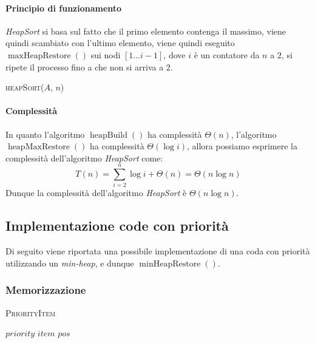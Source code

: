             \paragraph{Principio di funzionamento} \textit{HeapSort} si basa sul fatto che il primo elemento contenga il massimo, viene quindi scambiato con l'ultimo elemento, viene quindi eseguito $\operatorname{maxHeapRestore}()$ sui nodi $[1\dots i-1]$, dove $i$ è un contatore da $n$ a $2$, si ripete il processo fino a che non si arriva a $2$.
            \begin{algorithm}
                \caption{\textsc{heapSort}(\Item[] $A$, \Int $n$)}
                \begin{algorithmic}
                    \State {}
                        \State {}
                        \State {}
                    \EndFor
                \end{algorithmic}
            \end{algorithm}
            \paragraph{Complessità} In quanto l'algoritmo $\operatorname{heapBuild}()$ ha complessità $\Theta(n)$, l'algoritmo $\operatorname{heapMaxRestore}()$ ha complessità $\Theta(\log i)$, allora possiamo esprimere la complessità dell'algoritmo \textit{HeapSort} come: $$
                T(n)=\sum_{i=2}^{n}\log i+\Theta(n)=\Theta(n\log n)
            $$
            Dunque la complessità dell'algoritmo \textit{HeapSort} è $\Theta(n\log n)$.
    \subsection{Implementazione code con priorità}
        Di seguito viene riportata una possibile implementazione di una coda con priorità utilizzando un \textit{min-heap}, e dunque $\operatorname{minHeapRestore}()$.
        \subsubsection{Memorizzazione}
            
            \begin{algorithm}[H]
                \caption{\textsc{PriorityItem}}
                \begin{algorithmic}
                    \State \Int $priority$ 
                    \State \Item $item$ 
                    \State \Int $pos$ 
                \end{algorithmic}
            \end{algorithm}

